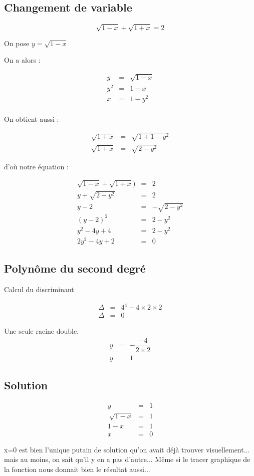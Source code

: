 \documentclass[11pt]{article}
\begin{document}
\begin{multicols}{2}
\subsection*{Changement de variable}

$$\sqrt{1-x} + \sqrt{1+x} = 2$$

On pose  $y = \sqrt{1-x}$

On a alors : 

\begin{eqnarray*}
y &=& \sqrt{1-x} \\
y^2 &=& 1-x \\
x &=& 1-y^2 \\ 
\end{eqnarray*}

On obtient aussi :

\begin{eqnarray*} 
\sqrt{1+x} &=& \sqrt{1+1-y^2} \\
\sqrt{1+x} &=& \sqrt{2-y^2} 
\end{eqnarray*}

d'où notre équation : 

\begin{eqnarray*} 
\sqrt{1-x} + \sqrt{1+x}) &=& 2 \\
y + \sqrt{2-y^2}  &=& 2  \\
y - 2 &=& - \sqrt{2-y^2}\\
(y - 2)^2 &=& 2 - y^2\\
y^2 -4y + 4 &=& 2 - y^2\\
2y^2 - 4y + 2 &=& 0
\end{eqnarray*}

\subsection*{Polynôme du second degré}

Calcul du discriminant

\begin{eqnarray*} 
\Delta &=& 4^4 - 4\times 2\times 2 \\
\Delta &=& 0
\end{eqnarray*}

Une seule racine double.
\begin{eqnarray*} 
y &=& -\dfrac{-4}{2\times2} \\
y &=& 1
\end{eqnarray*}

\subsection*{Solution}

\begin{eqnarray*} 
y &=& 1 \\\
\sqrt{1-x} &=& 1 \\ 
1-x &=& 1\\
x &=& 0
\end{eqnarray*}

x=0 est bien l'unique putain de solution qu'on avait déjà trouver visuellement... mais au moins, on sait qu'il y en a pas d'autre... Même si le tracer graphique de la fonction nous donnait bien le résultat aussi...

\end{multicols}
\end{document}
